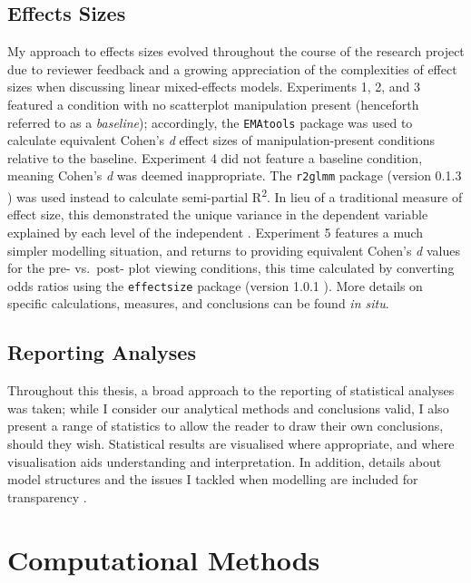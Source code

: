 \documentclass[../main.tex]{subfiles}
\begin{document}
\subsection{Effects Sizes}\label{effects-sizes}

My approach to effects sizes evolved throughout the course of the
research project due to reviewer feedback and a growing appreciation of
the complexities of effect sizes when discussing linear mixed-effects
models. Experiments 1, 2, and 3 featured a condition with no scatterplot
manipulation present (henceforth referred to as a \emph{baseline});
accordingly, the \texttt{EMAtools} package \cite{ematools} was used to
calculate equivalent Cohen's \emph{d} effect sizes of
manipulation-present conditions relative to the baseline. Experiment 4
did not feature a baseline condition, meaning Cohen's \emph{d} was
deemed inappropriate. The \texttt{r2glmm} package (version 0.1.3
\cite{r2glmm}) was used instead to calculate semi-partial
R\textsuperscript{2}. In lieu of a traditional measure of effect size,
this demonstrated the unique variance in the dependent variable
explained by each level of the independent \cite{nakagawa_2013}.
Experiment 5 features a much simpler modelling situation, and returns to
providing equivalent Cohen's \emph{d} values for the pre- vs.~post- plot
viewing conditions, this time calculated by converting odds ratios using
the \texttt{effectsize} package (version 1.0.1 \cite{effectsize}). More
details on specific calculations, measures, and conclusions can be found
\emph{in situ}.

\subsection{Reporting Analyses}\label{reporting-analyses}

Throughout this thesis, a broad approach to the reporting of statistical
analyses was taken; while I consider our analytical methods and
conclusions valid, I also present a range of statistics to allow the
reader to draw their own conclusions, should they wish. Statistical
results are visualised where appropriate, and where visualisation aids
understanding and interpretation. In addition, details about model
structures and the issues I tackled when modelling are included for
transparency \cite{meteyard_2020}.

\section{Computational Methods}\label{computational-methods}
\end{document}
